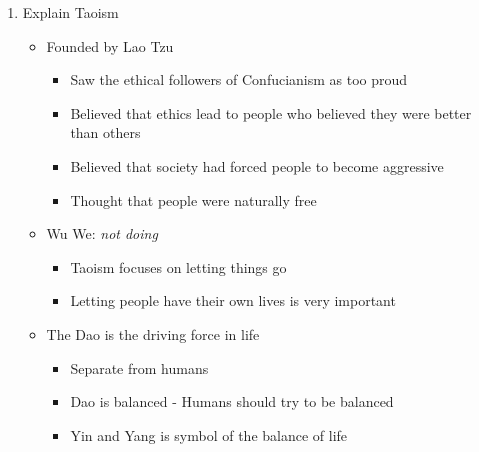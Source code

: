 \documentclass[8pt]{article}
\begin{document}
\begin{enumerate}
    \item Explain Taoism
    \begin{itemize}
        \item Founded by Lao Tzu
        \begin{itemize}
            \item Saw the ethical followers of Confucianism as too proud
            \item Believed that ethics lead to people who believed they were better than others
            \item Believed that society had forced people to become aggressive
            \item Thought that people were naturally free
        \end{itemize}
        \item Wu We: \textit{not doing}
        \begin{itemize}
            \item Taoism focuses on letting things go
            \item Letting people have their own lives is very important
        \end{itemize}
        \item The Dao is the driving force in life
        \begin{itemize}
            \item Separate from humans
            \item Dao is balanced - Humans should try to be balanced
            \item Yin and Yang is symbol of the balance of life
        \end{itemize}
    \end{itemize}
\end{enumerate}
\end{document}
